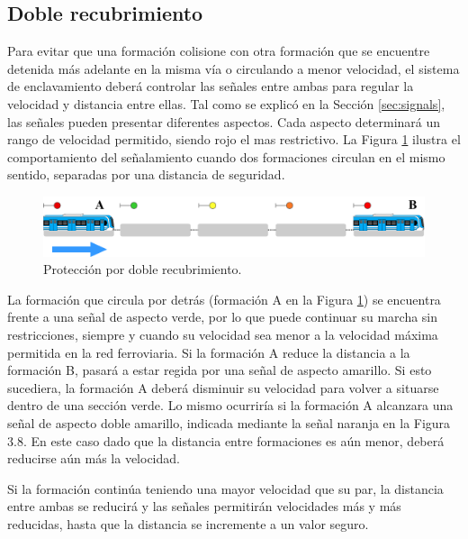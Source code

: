 \subsection{Doble recubrimiento}

	\label{sec:function_5}
	
	Para evitar que una formación colisione con otra formación que se encuentre detenida más adelante en la misma vía o circulando a menor velocidad, el sistema de enclavamiento deberá controlar las señales entre ambas para regular la velocidad y distancia entre ellas. Tal como se explicó en la Sección \ref{sec:signals}, las señales pueden presentar diferentes aspectos. Cada aspecto determinará un rango de velocidad permitido, siendo rojo el mas restrictivo. La Figura \ref{fig:ACG_recrubrimiento_1} ilustra el comportamiento del señalamiento cuando dos formaciones circulan en el mismo sentido, separadas por una distancia de seguridad.
	
	\begin{figure}[!h]
		\centering
		\includegraphics[width=1\textwidth]{Figuras/recubrimiento}
		\centering\caption{Protección por doble recubrimiento.}
		\label{fig:ACG_recrubrimiento_1}
	\end{figure}
	
	La formación que circula por detrás (formación A en la Figura \ref{fig:ACG_recrubrimiento_1}) se encuentra frente a una señal de aspecto verde, por lo
	que puede continuar su marcha sin restricciones, siempre y cuando su velocidad sea menor a la velocidad máxima permitida en la red ferroviaria. Si la formación A reduce la distancia a la formación B, pasará a estar regida por una señal de aspecto amarillo. Si esto sucediera, la formación A deberá disminuir su velocidad para volver a situarse dentro de una sección verde. Lo mismo ocurriría si la formación A alcanzara una señal de aspecto doble amarillo, indicada mediante la señal naranja en la Figura 3.8. En este caso dado que la distancia entre formaciones es aún menor, deberá reducirse aún más la velocidad.
	
	Si la formación continúa teniendo una mayor velocidad que su par, la distancia entre ambas se reducirá y las señales permitirán velocidades más y más reducidas, hasta que la distancia se incremente a un valor seguro.
	
